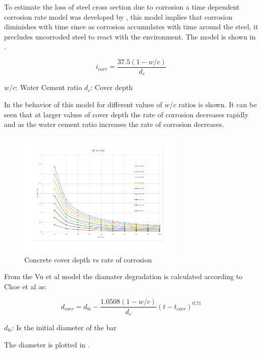 To estimate the loss of steel cross section due to corrosion a time dependent corrosion rate model was developed by \cite{Vu2000}, this model implies that corrosion diminishes with time since as corrosion accumulates with time around the steel, it precludes uncorroded steel to react with the environment. The model is shown in .

\begin{equation}
  i_{corr}=\frac{37.5(1-w/c)}{d_c}
  \label{eq.five}
\end{equation} 

$w/c$: Water Cement ratio
$d_c$: Cover depth

In  the behavior of this model for different values of $w/c$ ratios is shown. It can be seen that at larger values of cover depth the rate of corrosion decreases rapidly and as the water cement ratio increases the rate of corrosion decreases.
%
\begin{figure}[htbp]
\centering
\includegraphics[width=0.7\textwidth]{Chapter-1/figs/dcvsicor}
\caption{Concrete cover depth vs rate of corrosion}
\label{fig:hist1}
\end{figure}

From the Vu et al model the diamater degradation is calculated according to Choe et al as:

\begin{equation}
  d_{corr}=d_{bi}-\frac{1.0508(1-w/c)}{d_c} (t-t_{corr})^{0.71}
  \label{eq.six}
\end{equation} 

$d_{bi}$: Is the initial diameter of the bar

The diameter is plotted in .


